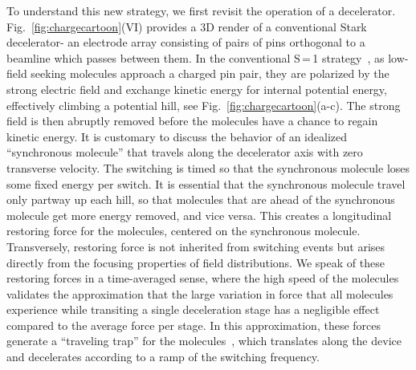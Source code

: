 \documentclass[%
 reprint,
 amsmath,amssymb,
 aps,
prl,
]{revtex4-1}
\begin{document}
To understand this new strategy, we first revisit the operation of a decelerator. 
Fig.~\ref{fig:chargecartoon}(VI) provides a 3D render of a conventional Stark decelerator- an electrode array consisting of pairs of pins orthogonal to a beamline which passes between them.
In the conventional S\,=\,1 strategy~\cite{VanDeMeerakker2012}, as low-field seeking molecules approach a charged pin pair, they are polarized by the strong electric field and exchange kinetic energy for internal potential energy, effectively climbing a potential hill, see Fig.~\ref{fig:chargecartoon}(a-c).
The strong field is then abruptly removed before the molecules have a chance to regain kinetic energy. 
It is customary to discuss the behavior of an idealized ``synchronous molecule'' that travels along the decelerator axis with zero transverse velocity.
The switching is timed so that the synchronous molecule loses some fixed energy per switch.
It is essential that the synchronous molecule travel only partway up each hill, so that molecules that are ahead of the synchronous molecule get more energy removed, and vice versa.
This creates a longitudinal restoring force for the molecules, centered on the synchronous molecule.
Transversely, restoring force is not inherited from switching events but arises directly from the focusing properties of field distributions.
We speak of these restoring forces in a time-averaged sense, where the high speed of the molecules validates the approximation that the large variation in force that all molecules experience while transiting a single deceleration stage has a negligible effect compared to the average force per stage.
In this approximation, these forces generate a ``traveling trap'' for the molecules~\cite{Bethlem2000}, which translates along the device and decelerates according to a ramp of the switching frequency.
\end{document}
